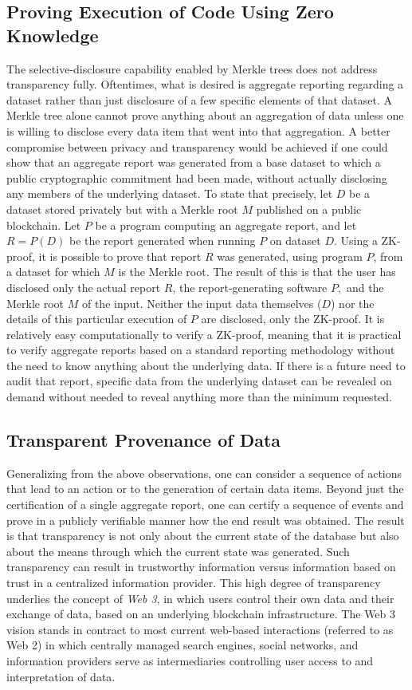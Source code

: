 \documentclass[11pt,dvipdfm]{article}
\begin{document}
\subsection{Proving Execution of Code Using Zero Knowledge}
The selective-disclosure capability enabled by Merkle trees does not address transparency fully.  Oftentimes, what is
desired is aggregate reporting regarding a dataset rather than just disclosure of a few specific elements of that dataset.
A Merkle tree alone cannot prove anything about an aggregation of data unless one is willing to disclose every data item
that went into that aggregation.
A better compromise between privacy and transparency would be achieved if one could show that an aggregate report
was generated from a base dataset to which a public cryptographic commitment had been made, without actually disclosing any members of
the underlying dataset. 
To state that precisely, let $D$  be a dataset stored privately but with a Merkle root $M$ published on a public
blockchain.  Let $P$ be a program computing an aggregate report, and let $R=P(D)$ be the report generated when
running $P$ on dataset $D$.
Using a ZK-proof, it is possible to prove that report $R$ was generated, using program $P$, from a dataset for which $M$ is the 
Merkle root.  The result of this is that the user has disclosed only the actual report $R$, the
report-generating software $P,$ and the Merkle root $M$ of the input.  Neither the input data themselves ($D$) nor the details of
this particular execution of $P$ are disclosed, only the ZK-proof.
It is relatively easy computationally to verify a ZK-proof, meaning that it is practical to verify aggregate
reports based on a standard reporting methodology without the need to know anything about the underlying data.
If there is a future need to audit that report, specific data from the underlying dataset can be revealed on demand
without needed to reveal anything more than the minimum requested.  

\subsection{Transparent Provenance of Data}
Generalizing from the above observations, one can consider a sequence of actions that lead to an action or to the
generation of certain data items.
Beyond just the certification of a single aggregate report, one can certify a sequence of events and prove in a
publicly verifiable manner how the end result was obtained.  
The result is that transparency is not only about the current state of the database but also about the means
through which the current state was generated. 
Such transparency can result in trustworthy information versus information based on trust in a centralized information 
provider.  
This high degree of transparency underlies the concept of {\em Web 3}, in which users control their own data
and their exchange of data, based on an underlying blockchain infrastructure.
The Web 3 vision stands in contract to most current web-based interactions (referred to as Web 2) in which
centrally managed search engines, social networks, and information providers serve as intermediaries controlling
user access to and interpretation of data.
\end{document}
